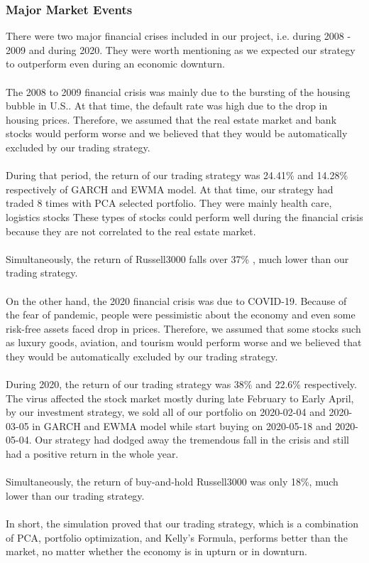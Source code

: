 \documentclass[11pt,a4paper]{article}
\begin{document}
    \subsubsection{Major Market Events}
    There were two major financial crises included in our project, i.e. during 2008 - 2009 and during 2020. They were worth mentioning as we expected our strategy to outperform even during an economic downturn. \\ \\
    The 2008 to 2009 financial crisis was mainly due to the bursting of the housing bubble in U.S.. At that time, the default rate was high due to the drop in housing prices. Therefore, we assumed that the real estate market and bank stocks would perform worse and we believed that they would be automatically excluded by our trading strategy. \\ \\
    During that period, the return of our trading strategy was 24.41\% and 14.28\% respectively of GARCH and EWMA model. At that time, our strategy had traded 8 times with PCA selected portfolio. They were mainly health care, logistics stocks  These types of stocks could perform well during the financial crisis because they are not correlated to the real estate market. \\ \\
    Simultaneously, the return of Russell3000 falls over 37\%  , much lower than our trading strategy. \\ \\
    On the other hand, the 2020 financial crisis was due to COVID-19. Because of the fear of pandemic, people were pessimistic about the economy and even some risk-free assets faced drop in prices. Therefore, we assumed that some stocks such as luxury goods, aviation, and tourism would perform worse and we believed that they would be automatically excluded by our trading strategy. \\ \\
    During 2020, the return of our trading strategy was 38\% and 22.6\% respectively. The virus affected the stock market mostly during late February to Early April, by our investment strategy, we sold all of our portfolio on 2020-02-04 and 2020-03-05 in GARCH and EWMA model while start buying on 2020-05-18 and 2020-05-04. Our strategy had dodged away the tremendous fall in the crisis and still had a positive return in the whole year. \\ \\
    Simultaneously, the return of buy-and-hold Russell3000 was only 18\%, much lower than our trading strategy. \\ \\
    In short, the simulation proved that our trading strategy, which is a combination of PCA, portfolio optimization, and Kelly's Formula, performs better than the market, no matter whether the economy is in upturn or in downturn.
    
\end{document}
